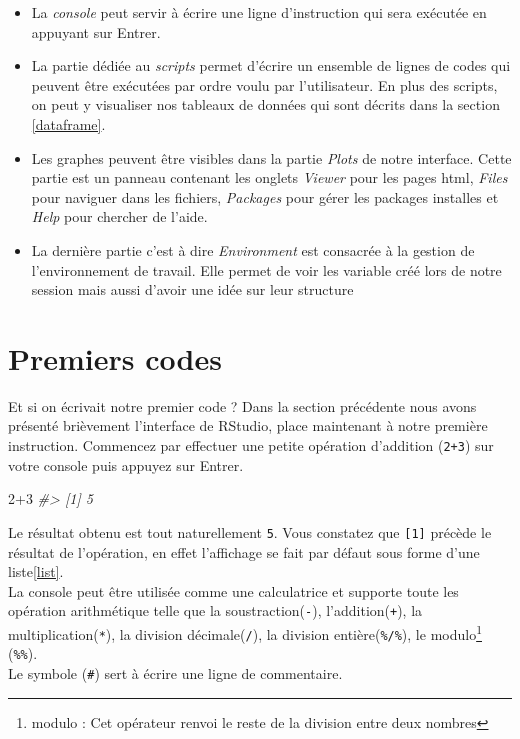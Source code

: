 \documentclass[
]{book}
\newenvironment{Shaded}{\begin{snugshade}}{\end{snugshade}}
\newcommand{\CommentTok}[1]{\textcolor[rgb]{0.56,0.35,0.01}{\textit{#1}}}
\newcommand{\DecValTok}[1]{\textcolor[rgb]{0.00,0.00,0.81}{#1}}
\newcommand{\SpecialCharTok}[1]{\textcolor[rgb]{0.00,0.00,0.00}{#1}}
\providecommand{\tightlist}{%
  \setlength{\itemsep}{0pt}\setlength{\parskip}{0pt}}
\theoremstyle{definition}
\theoremstyle{definition}
\theoremstyle{definition}
\theoremstyle{definition}
\theoremstyle{remark}
\begin{document}
\begin{itemize}
\tightlist
\item
  La \emph{console} peut servir à écrire une ligne d'instruction qui sera exécutée en appuyant sur Entrer.\\
\item
  La partie dédiée au \emph{scripts} permet d'écrire un ensemble de lignes de codes qui peuvent être exécutées par ordre voulu par l'utilisateur. En plus des scripts, on peut y visualiser nos tableaux de données qui sont décrits dans la section \ref{dataframe}.\\
\item
  Les graphes peuvent être visibles dans la partie \emph{Plots} de notre interface. Cette partie est un panneau contenant les onglets \emph{Viewer} pour les pages html, \emph{Files} pour naviguer dans les fichiers, \emph{Packages} pour gérer les packages installes et \emph{Help} pour chercher de l'aide.\\
\item
  La dernière partie c'est à dire \emph{Environment} est consacrée à la gestion de l'environnement de travail. Elle permet de voir les variable créé lors de notre session mais aussi d'avoir une idée sur leur structure
\end{itemize}

\hypertarget{firstcode}{%
\section{Premiers codes}\label{firstcode}}

Et si on écrivait notre premier code ?
Dans la section précédente nous avons présenté brièvement l'interface de RStudio, place maintenant à notre première instruction. Commencez par effectuer une petite opération d'addition (\texttt{2+3}) sur votre console puis appuyez sur Entrer.

\begin{Shaded}
\begin{Highlighting}[]
\DecValTok{2}\SpecialCharTok{+}\DecValTok{3}
\CommentTok{\#\textgreater{} [1] 5}
\end{Highlighting}
\end{Shaded}

Le résultat obtenu est tout naturellement \texttt{5}. Vous constatez que \texttt{{[}1{]}} précède le résultat de l'opération, en effet l'affichage se fait par défaut sous forme d'une liste\ref{list}.\\
La console peut être utilisée comme une calculatrice et supporte toute les opération arithmétique telle que la soustraction(\texttt{-}), l'addition(\texttt{+}), la multiplication(\texttt{*}), la division décimale(\texttt{/}), la division entière(\texttt{\%/\%}), le modulo\footnote{modulo : Cet opérateur renvoi le reste de la division entre deux nombres} (\texttt{\%\%}).\\
Le symbole (\texttt{\#}) sert à écrire une ligne de commentaire.
\end{document}
